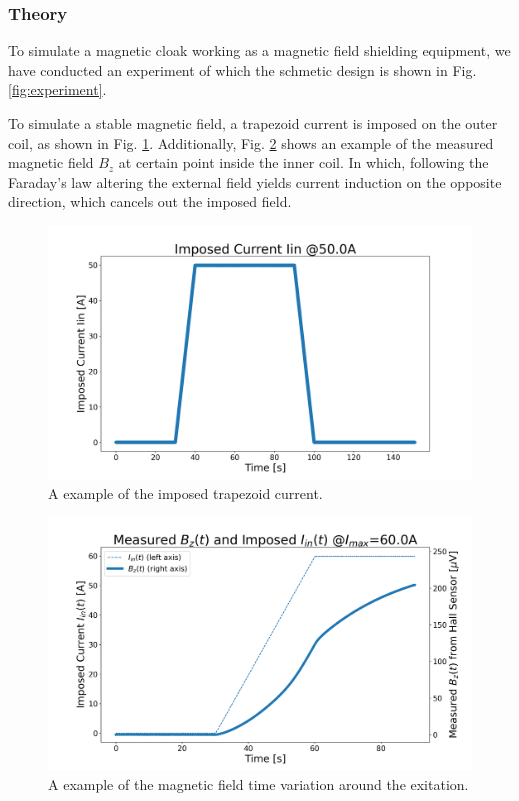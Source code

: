 \subsubsection{Theory}
To simulate a magnetic cloak working as a magnetic field shielding equipment,
we have conducted an experiment of which the schmetic design is shown in Fig. \ref{fig:experiment}.

To simulate a stable magnetic field, a trapezoid current is imposed on the outer coil,
as shown in Fig. \ref{fig:imposedCurrentExample}.
Additionally, Fig. \ref{fig:DCTimeSeriesExample} shows an example of the measured magnetic field $B_z$ at certain point inside the inner coil.
In which, following the Faraday's law
altering the external field yields current induction on the opposite direction,
which cancels out the imposed field.
\begin{figure}[H]
  \includegraphics[width=17cm, bb=9 9 900 550]{./section3Effectiveness/imposedCurrentExample.png}
  \caption{A example of the imposed trapezoid current.}
  \label{fig:imposedCurrentExample}
\end{figure}
\begin{figure}[H]
  \includegraphics[width=17cm, bb=9 9 900 490]{./section3Effectiveness/DCTimeSeriesExample.png}
  \caption{A example of the magnetic field time variation around the exitation.}
  \label{fig:DCTimeSeriesExample}
\end{figure}

